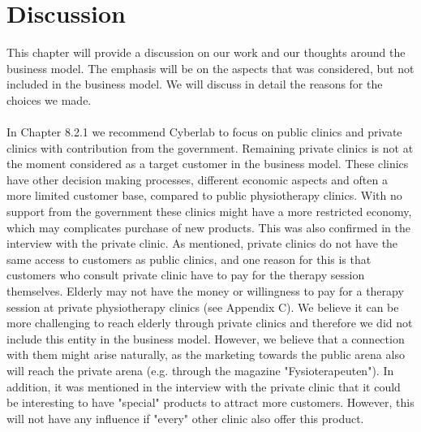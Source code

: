 \chapter{Discussion}
This chapter will provide a discussion on our work and our thoughts around the business model. The emphasis will be on the aspects that was considered, but not included in the business model. We will discuss in detail the reasons for the choices we made.  \\ \\
In Chapter 8.2.1 we recommend Cyberlab to focus on public clinics and private clinics with contribution from the government. Remaining private clinics is not at the moment considered as a target customer in the business model. These clinics have other decision making processes, different economic aspects and often a more limited customer base, compared to public physiotherapy clinics. With no support from the government these clinics might have a more restricted economy, which may complicates purchase of new products. This was also confirmed in the interview with the private clinic. As mentioned, private clinics do not have the same access to customers as public clinics, and one reason for this is that customers who consult private clinic have to pay for the therapy session themselves. Elderly may not have the money or willingness to pay for a therapy session at private physiotherapy clinics (see Appendix C). We believe it can be more challenging to reach elderly through private clinics and therefore we did not include this entity in the business model. However, we believe that a connection with them might arise naturally, as the marketing towards the public arena also will reach the private arena (e.g. through the magazine "Fysioterapeuten"). In addition, it was mentioned in the interview with the private clinic that it could be interesting to have "special" products to attract more customers. However, this will not have any influence if "every" other clinic also offer this product.  \\ \\
